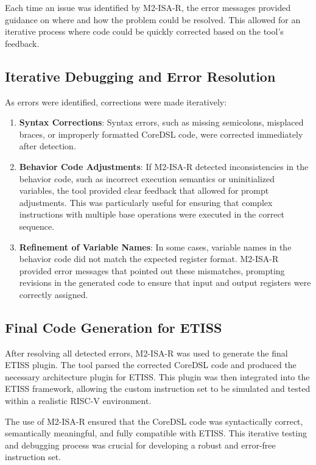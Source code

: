 Each time an issue was identified by M2-ISA-R, the error messages provided guidance on where and how the problem could be resolved. This allowed for an iterative process where code could be quickly corrected based on the tool's feedback.

\subsection{Iterative Debugging and Error Resolution}

As errors were identified, corrections were made iteratively:

\begin{enumerate}
    \item \textbf{Syntax Corrections}: Syntax errors, such as missing semicolons, misplaced braces, or improperly formatted CoreDSL code, were corrected immediately after detection.
    \item \textbf{Behavior Code Adjustments}: If M2-ISA-R detected inconsistencies in the behavior code, such as incorrect execution semantics or uninitialized variables, the tool provided clear feedback that allowed for prompt adjustments. This was particularly useful for ensuring that complex instructions with multiple base operations were executed in the correct sequence.
    \item \textbf{Refinement of Variable Names}: In some cases, variable names in the behavior code did not match the expected register format. M2-ISA-R provided error messages that pointed out these mismatches, prompting revisions in the generated code to ensure that input and output registers were correctly assigned.
\end{enumerate}

\subsection{Final Code Generation for ETISS}

After resolving all detected errors, M2-ISA-R was used to generate the final ETISS plugin. The tool parsed the corrected CoreDSL code and produced the necessary architecture plugin for ETISS. This plugin was then integrated into the ETISS framework, allowing the custom instruction set to be simulated and tested within a realistic RISC-V environment.

The use of M2-ISA-R ensured that the CoreDSL code was syntactically correct, semantically meaningful, and fully compatible with ETISS. This iterative testing and debugging process was crucial for developing a robust and error-free instruction set.

